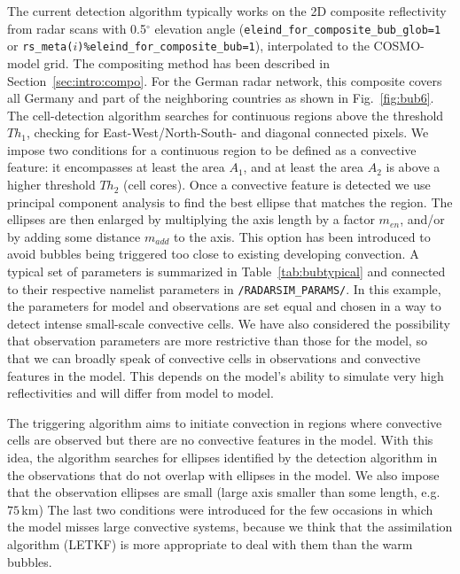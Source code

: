\documentclass[10pt,a4paper,twoside,headinclude,footinclude,parskip=half]{scrartcl}
\newcommand{\grad}{\ensuremath{^{\circ}}\xspace}
\newcommand{\srcform}[1]{\mbox{\texttt{#1}}\xspace}%
\begin{document}
The current detection algorithm typically works on the 2D composite reflectivity from radar scans with 0.5\grad elevation angle
(\srcform{eleind_for_composite_bub_glob=1} or \srcform{rs_meta($i$)\%eleind_for_composite_bub=1}),
interpolated to the COSMO-model grid. The compositing method has been described in Section~\ref{sec:intro:compo}.
For the German radar network, this composite covers all Germany and part of the neighboring countries as
shown in Fig.~\ref{fig:bub6}. The cell-detection algorithm searches for continuous regions above the
threshold $Th_1$, checking for East-West/North-South- and diagonal connected pixels.
We impose two conditions for a continuous region to be defined as a convective feature:
it encompasses at least the area $A_1$, and at least the area $A_2$ is above a higher threshold $Th_2$ (cell cores).
Once a convective feature is detected we use principal component analysis to find the best
ellipse that matches the region. The ellipses are then enlarged by multiplying the axis length by a factor $m_{en}$,
and/or by adding some distance $m_{add}$ to the axis. This option has been introduced to avoid bubbles being
triggered too close to existing developing convection. A typical set of parameters is summarized in Table~\ref{tab:bubtypical}
and connected to their respective namelist parameters in \srcform{/RADARSIM_PARAMS/}.
In this example, the parameters for model and observations are set equal and chosen in a way to detect intense
small-scale convective cells. We have also considered the possibility that observation parameters
are more restrictive than those for the model, so that we can broadly speak of convective cells in
observations and convective features in the model. This depends on the model's ability to simulate
very high reflectivities and will differ from model to model.

The triggering algorithm aims to initiate convection in regions where convective cells are observed but
there are no convective features in the model. With this idea, the algorithm searches for ellipses
identified by the detection algorithm in the observations that do not overlap with ellipses in the model.
We also impose that the observation ellipses are small (large axis smaller than some length, e.g. $75\,$km)
The last two conditions were introduced for the few occasions in which the model misses large
convective systems, because we think that the assimilation algorithm (LETKF) is more appropriate
to deal with them than the warm bubbles.
\end{document}
